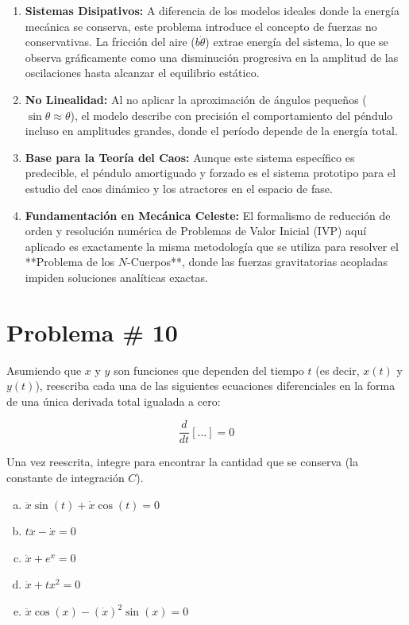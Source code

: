 \documentclass[a4paper]{article}
\begin{document}
\begin{enumerate}
    \item \textbf{Sistemas Disipativos:} A diferencia de los modelos ideales donde la energía mecánica se conserva, este problema introduce el concepto de fuerzas no conservativas. La fricción del aire ($b \dot{\theta}$) extrae energía del sistema, lo que se observa gráficamente como una disminución progresiva en la amplitud de las oscilaciones hasta alcanzar el equilibrio estático.
    \item \textbf{No Linealidad:} Al no aplicar la aproximación de ángulos pequeños ($\sin \theta \approx \theta$), el modelo describe con precisión el comportamiento del péndulo incluso en amplitudes grandes, donde el período depende de la energía total.
    \item \textbf{Base para la Teoría del Caos:} Aunque este sistema específico es predecible, el péndulo amortiguado y forzado es el sistema prototipo para el estudio del caos dinámico y los atractores en el espacio de fase.
    \item \textbf{Fundamentación en Mecánica Celeste:} El formalismo de reducción de orden y resolución numérica de Problemas de Valor Inicial (IVP) aquí aplicado es exactamente la misma metodología que se utiliza para resolver el **Problema de los $N$-Cuerpos**, donde las fuerzas gravitatorias acopladas impiden soluciones analíticas exactas.
\end{enumerate}



\section{Problema \# 10}

Asumiendo que $x$ y $y$ son funciones que dependen del tiempo $t$ (es decir, $x(t)$ y $y(t)$), reescriba cada una de las siguientes ecuaciones diferenciales en la forma de una única derivada total igualada a cero:

$$ \frac{d}{dt} [...] = 0 $$

Una vez reescrita, integre para encontrar la cantidad que se conserva (la constante de integración $C$).

\begin{enumerate}[a)]
    \item $\ddot{x} \sin(t) + \dot{x} \cos(t) = 0$
    \item $t\ddot{x} - \dot{x} = 0$
    \item $\ddot{x} + e^x = 0$
    \item $\dot{x} + tx^2 = 0$
    \item $\ddot{x} \cos(x) - (\dot{x})^2 \sin(x) = 0$
\end{enumerate}
\end{document}
